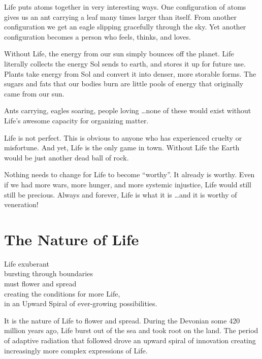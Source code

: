 \documentclass[ebook,12pt,openany,twoside]{memoir}
\newcommand{\tab}{\hspace*{2em}}
\newcommand{\imagefacingchapter}[1]{
  \cleartoverso
  \clearpage \null
  \thispagestyle{cleared}
  \AddToShipoutPictureBG*{%
    \AtStockLowerLeft{%
      \texttt{[image: \#1]}
    }
  }
  \clearpage
}
\begin{document}
\noindent Life puts atoms together in very interesting ways. One configuration
of atoms gives us an ant carrying a leaf many times larger than itself. From
another configuration we get an eagle slipping gracefully through the sky. Yet
another configuration becomes a person who feels, thinks, and loves.

Without Life, the energy from our sun simply bounces off the planet. Life
literally collects the energy Sol sends to earth, and stores it up for future
use. Plants take energy from Sol and convert it into denser, more storable
forms. The sugars and fats that our bodies burn are little pools of energy that
originally came from our sun.

Ants carrying, eagles soaring, people loving \ldots none of these would exist
without Life's awesome capacity for organizing matter.

Life is not perfect. This is obvious to anyone who has experienced cruelty or
misfortune. And yet, Life is the only game in town. Without Life the Earth
would be just another dead ball of rock.

Nothing needs to change for Life to become ``worthy''. It already is worthy.
Even if we had more wars, more hunger, and more systemic injustice, Life would
still still be precious. Always and forever, Life is what it is \ldots and it
is worthy of veneration!









\imagefacingchapter{images/UpwardSpiral}
\chapter{The Nature of Life}

\setlength\epigraphwidth{3.6in}
\epigraph{
  Life exuberant\\
  bursting through boundaries\\
  must flower and spread\\
  \tab creating the conditions for more Life,\\
  \tab in an Upward Spiral of ever-growing possibilities.
}{}

\noindent It is the nature of Life to flower and spread. During the Devonian
some 420 million years ago, Life burst out of the sea and took root on the
land. The period of adaptive radiation that followed drove an upward spiral of
innovation creating increasingly more complex expressions of Life.
\end{document}
